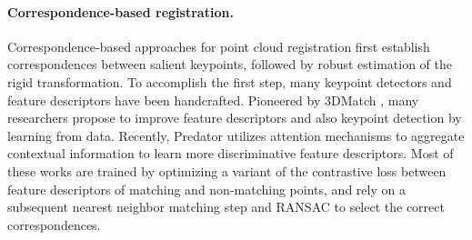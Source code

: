 \documentclass[10pt,twocolumn,letterpaper]{article}
\begin{document}
\paragraph{Correspondence-based registration.}
Correspondence-based approaches for point cloud registration first establish correspondences between salient keypoints, followed by robust estimation of the rigid transformation. To accomplish the first step, many keypoint detectors \cite{zhong2009iss,steder2010narf} and feature descriptors \cite{rusu2009fpfh,tombari2010usc} have been handcrafted. Pioneered by 3DMatch \cite{zeng20163dmatch}, many researchers propose to improve feature descriptors \cite{zeng20163dmatch,khoury2017cgf,deng2018ppfnet,choy2019fcgf} and also keypoint detection \cite{yew20183dfeatnet,li2019usip,bai2020d3feat} by learning from data. Recently, Predator \cite{huang2021predator} utilizes attention mechanisms to aggregate contextual information to learn more discriminative feature descriptors. Most of these works are trained by optimizing a variant of the contrastive loss \cite{chopra2005contrastiveloss,schroff2015facenet} between feature descriptors of matching and non-matching points, and rely on a subsequent nearest neighbor matching step and RANSAC to select the correct correspondences.

\vspace{-4.2mm}
\end{document}
